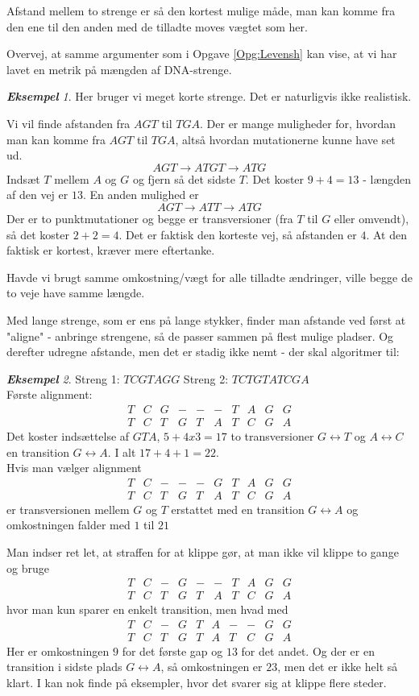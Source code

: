 \documentclass[a4paper, 12pt]{article}
\theoremstyle{remark}
\newtheorem{Eksempel}{\textbf{Eksempel}}
\begin{document}
Afstand mellem to strenge er så den kortest mulige måde, man kan komme fra den ene til den anden med de tilladte moves vægtet som her. 

Overvej, at samme argumenter som i Opgave \ref{Opg:Levensh} kan vise, at vi har lavet en metrik på mængden af DNA-strenge.

\begin{Eksempel} 
Her bruger vi meget korte strenge. Det er naturligvis ikke realistisk. 

Vi vil finde afstanden fra $AGT$ til $TGA$. Der er mange muligheder for, hvordan man kan komme fra $AGT$ til $TGA$, altså hvordan mutationerne kunne have set ud. 
$$ AGT \to ATGT \to ATG$$
Indsæt $T$ mellem $A$ og $G$ og fjern så det sidste $T$. Det koster $9+4 =13$ - længden af den vej er $13$. En anden mulighed er 
$$AGT\to ATT \to ATG$$
Der er to punktmutationer og begge er transversioner (fra $T$ til $G$ eller omvendt), så det koster $2+2=4$. Det er faktisk den korteste vej, så afstanden er $4$. At den faktisk er kortest, kræver mere eftertanke. 

Havde vi brugt samme omkostning/vægt for alle tilladte ændringer, ville begge de to veje have samme længde. 

\end{Eksempel}
Med lange strenge, som er ens på lange stykker, finder man afstande ved først at "aligne"\; - anbringe strengene, så de passer sammen på flest mulige pladser. Og derefter udregne afstande, men det er stadig ikke nemt - der skal algoritmer til:
\begin{Eksempel}
Streng 1: $TCGTAGG$ Streng 2: $TCTGTATCGA$
\\Første alignment:
$$\begin{matrix}T&C&G&-&-&-&T&A&G&G\\T&C&T&G&T&A&T&C&G&A\end{matrix}$$
Det koster indsættelse af $GTA$, $5+4x3=17$ to  transversioner $G\leftrightarrow T$ og $A\leftrightarrow C$ en transition $G\leftrightarrow A$. I alt $17+4+1=22$.\\
Hvis man vælger alignment 
$$\begin{matrix}T&C&-&-&-&G&T&A&G&G\\T&C&T&G&T&A&T&C&G&A\end{matrix}$$
er transversionen mellem $G$ og $T$ erstattet med en transition $G\leftrightarrow A$ og omkostningen falder med $1$ til $21$

Man indser ret let, at straffen for at klippe gør, at man ikke vil klippe to gange og  bruge 
$$\begin{matrix}T&C&-&G&-&-&T&A&G&G\\T&C&T&G&T&A&T&C&G&A\end{matrix}$$
hvor man kun sparer en enkelt transition, men hvad med 
$$\begin{matrix}T&C&-&G&T&A&-&-&G&G\\T&C&T&G&T&A&T&C&G&A\end{matrix}$$
Her er omkostningen $9$ for det første gap og $13$ for det andet. Og der er en transition i sidste plads $G\leftrightarrow A$, så omkostningen er $23$, men det er ikke helt så klart. I kan nok finde på eksempler, hvor det svarer sig at klippe flere steder. 
\end{Eksempel}
\end{document}
